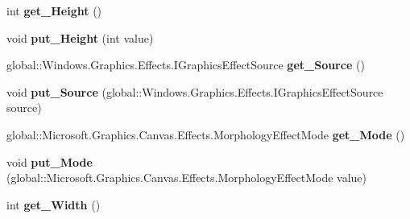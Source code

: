 \begin{DoxyCompactItemize}
int {\bfseries get\+\_\+\+Height} ()
\item 
\mbox{\label{interface_microsoft_1_1_graphics_1_1_canvas_1_1_effects_1_1_i_morphology_effect_aefc8baeb4576bca214b2862f5b188ff8}} 
void {\bfseries put\+\_\+\+Height} (int value)
\item 
\mbox{\label{interface_microsoft_1_1_graphics_1_1_canvas_1_1_effects_1_1_i_morphology_effect_ac0ce4230c50de3053b0200c3868607d6}} 
global\+::\+Windows.\+Graphics.\+Effects.\+I\+Graphics\+Effect\+Source {\bfseries get\+\_\+\+Source} ()
\item 
\mbox{\label{interface_microsoft_1_1_graphics_1_1_canvas_1_1_effects_1_1_i_morphology_effect_a6aba3568850c2df11ccf1005f5ecfbca}} 
void {\bfseries put\+\_\+\+Source} (global\+::\+Windows.\+Graphics.\+Effects.\+I\+Graphics\+Effect\+Source source)
\item 
\mbox{\label{interface_microsoft_1_1_graphics_1_1_canvas_1_1_effects_1_1_i_morphology_effect_a4625903e2e2033038f140f494007ccef}} 
global\+::\+Microsoft.\+Graphics.\+Canvas.\+Effects.\+Morphology\+Effect\+Mode {\bfseries get\+\_\+\+Mode} ()
\item 
\mbox{\label{interface_microsoft_1_1_graphics_1_1_canvas_1_1_effects_1_1_i_morphology_effect_ae67e959972393bca5d6e02aa06cd227b}} 
void {\bfseries put\+\_\+\+Mode} (global\+::\+Microsoft.\+Graphics.\+Canvas.\+Effects.\+Morphology\+Effect\+Mode value)
\item 
\mbox{\label{interface_microsoft_1_1_graphics_1_1_canvas_1_1_effects_1_1_i_morphology_effect_a30eb746728372b5fdd4c6e783b9a3545}} 
int {\bfseries get\+\_\+\+Width} ()
\item 
\mbox{\label{interface_microsoft_1_1_graphics_1_1_canvas_1_1_effects_1_1_i_morphology_effect_ac8928007cf4daceb6edf45df25104160}} 

\end{DoxyCompactItemize}
